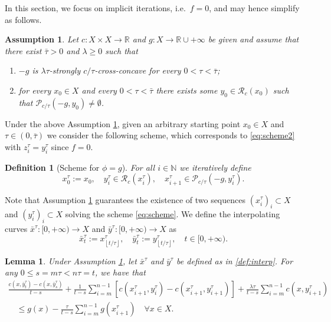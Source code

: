 \documentclass[reqno]{amsart}
\newcounter{results}[section]
\theoremstyle{plain}
\newtheorem{lemma}[results]{Lemma}
\theoremstyle{remark}
\theoremstyle{plain}
\newtheorem{definition}[results]{Definition}
\newtheorem{assumption}[results]{Assumption}
\numberwithin{equation}{section}
\theoremstyle{remark}
\newcommand{\N}{\mathbb{N}}
\newcommand{\R}{\mathbb{R}}
\newcommand{\YY}{X}
\newcommand{\floor}[1]{\left\lfloor#1\right\rfloor}
\begin{document}
 In this section, we focus  on implicit iterations, i.e.\ $f=0$, and may hence  simplify   as follows. 

\begin{assumption}\label{ass:ass1}  Let  $c:X \times \YY\to \R$ and $g: X \to \R \cup {+\infty}$  be given  and  assume   that there exist $\bar{\tau}>0$ and $\lambda \ge 0$ such that
\begin{enumerate}
\item $-g$ is $\lambda \tau$-strongly $c/\tau$-cross-concave for every $0<\tau< \bar{\tau}$;
\item for every $x_0 \in X$ and every $0< \tau<\bar{\tau}$ there exists some $y_0 \in \mathcal{R}_c(x_0)$ such that $\mathcal{P}_{c/\tau}(-g,y_0) \ne \emptyset$.
\end{enumerate}
\end{assumption}

Under the above Assumption \ref{ass:ass1},  given an arbitrary starting point $x_0 \in X$ and $\tau \in (0,\bar{\tau})$ we consider the following scheme, which corresponds to \eqref{eq:scheme2} with $z_i^\tau=y_i^\tau$ since $f=0$.


\begin{definition}[Scheme for $\phi=g$]\label{def:scheme}
For all  $i \in  \N $ we iteratively define
\begin{equation}\label{eq:scheme}
x^\tau_0:=x_0, \quad y_i^\tau \in \mathcal{R}_c(x^\tau_i), \quad x_{i+1}^\tau \in \mathcal{P}_{c/\tau}(-g, y_i^\tau).
\end{equation} 
\end{definition}

Note that Assumption {\ref{ass:ass1}} guarantees the existence of two sequences $(x_i^\tau)_i \subset X$ and $(y_i^\tau)_i \subset  X $ solving the scheme \eqref{eq:scheme}. We  define the  interpolating curves $\bar{x}^\tau: [0,+\infty) \to X$ and $\bar{y}^\tau:[0,+\infty) \to  X $ as 
\begin{equation} \bar{x}^\tau_t:= x^\tau_{\floor{t/\tau}}, \quad \bar{y}^\tau_t:= y^\tau_{\floor{t/\tau}}, \quad t \in [0,+\infty). \label{def:interp} 
\end{equation} 







 
\begin{lemma}\label{le:intevi} Under Assumption {\ref{ass:ass1}}, let $\bar{x}^\tau$ and $\bar{y}^\tau$ be  defined as in \eqref{def:interp}. For  any $0 \le s= m\tau < n\tau = t$,  we have that
\begin{multline}
    \frac{c(x,\bar{y}_t^\tau)-c(x,\bar{y}_s^\tau)}{t-s} + \frac{1}{t-s} \sum_{i=m}^{n-1}\left [c(x_{i+1}^\tau, y_i^\tau)-c(x_{i+1}^\tau, y_{i+1}^\tau) \right ] + \frac{\lambda \tau}{t-s} \sum_{i=m}^{n-1}c(x,y_{i+1}^\tau)\\
    \quad \le g(x) - \frac{\tau}{t-s} \sum_{i=m}^{n-1} g(x_{i+1}^\tau)\quad \forall x \in X.\label{eq:intevi}
    \end{multline} 
\end{lemma}
\end{document}
